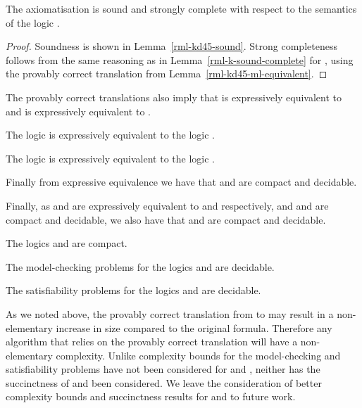 \begin{theorem}\label{rml-kd45-sound-complete}
The axiomatisation \axiomRmlKFF{} is sound and strongly complete with respect to the semantics of the logic \logicRmlKD{}.
\end{theorem}

\begin{proof}
Soundness is shown in Lemma~\ref{rml-kd45-sound}.
Strong completeness follows from the same reasoning as in Lemma~\ref{rml-k-sound-complete} for \axiomRmlK{}, using the provably correct translation from Lemma~\ref{rml-kd45-ml-equivalent}.
\end{proof}

\pagebreak

The provably correct translations also imply that \logicRmlKFF{} is expressively equivalent to \logicKFF{} and \logicRmlKD{} is expressively equivalent to \logicKD{}.

\begin{corollary}
The logic \logicRmlKFF{} is expressively equivalent to the logic \logicKFF{}.
\end{corollary}

\begin{corollary}
The logic \logicRmlKD{} is expressively equivalent to the logic \logicKD{}.
\end{corollary}

Finally from expressive equivalence we have that \logicRmlKFF{} and \logicRmlKD{} are compact and decidable.

Finally, as \logicRmlKFF{} and \logicRmlKD{} are expressively equivalent to \logicKFF{} and \logicKF{} respectively, and \logicKFF{} and \logicKD{} are compact and decidable, we also have that \logicRmlKFF{} and \logicRmlKD{} are compact and decidable.

\begin{corollary}
The logics \logicRmlKFF{} and \logicRmlKD{} are compact.
\end{corollary}

\begin{corollary}
The model-checking problems for the logics \logicRmlKFF{} and \logicRmlKD{} are decidable.
\end{corollary}

\begin{corollary}
The satisfiability problems for the logics \logicRmlKFF{} and \logicRmlKD{} are decidable.
\end{corollary}

As we noted above, the provably correct translation from \langRml{} to \langMl{} may result in a non-elementary increase in size compared to the original formula.
Therefore any algorithm that relies on the provably correct translation will have a non-elementary complexity.
Unlike \logicRmlK{} complexity bounds for the model-checking and satisfiability problems have not been considered for \logicRmlKFF{} and \logicRmlKD{}, neither has the succinctness of \logicRmlKFF{} and \logicRmlKD{} been considered.
We leave the consideration of better complexity bounds and succinctness results for \logicRmlKFF{} and \logicRmlKD{} to future work.
